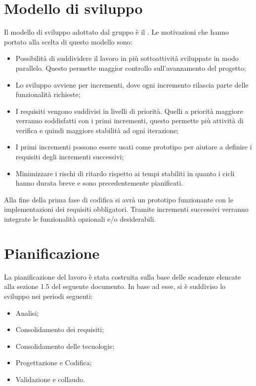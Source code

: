 \documentclass[../PianodiProgetto.tex]{subfiles}
\begin{document}
	
	\chapter{Modello di sviluppo}
	
	Il modello di sviluppo adottato dal gruppo è il . Le motivazioni che hanno portato alla scelta di questo modello sono:
	\begin{itemize}
		\item Possibilità di suddividere il lavoro in più sottoattività sviluppate in modo parallelo. Questo permette maggior controllo sull’avanzamento del progetto;
		\item Lo sviluppo avviene per incrementi, dove ogni incremento rilascia parte delle funzionalità richieste;
		\item I requisiti vengono suddivisi in livelli di priorità. Quelli a priorità maggiore verranno soddisfatti con i primi incrementi, questo permette più attività di verifica e quindi maggiore stabilità ad ogni iterazione;
		\item I primi incrementi possono essere usati come prototipo per aiutare a definire i requisiti degli incrementi successivi;
		\item Minimizzare i rischi di ritardo rispetto ai tempi stabiliti in quanto i cicli hanno durata breve e sono precedentemente pianificati.
	\end{itemize}
	Alla fine della prima fase di codifica si avrà un prototipo funzionante con le implementazioni dei requisiti obbligatori. Tramite incrementi successivi verranno integrate le funzionalità opzionali e/o desiderabili.
	
	\chapter{Pianificazione}
	
	La pianificazione del lavoro è stata costruita sulla base delle scadenze elencate alla sezione 1.5 del seguente documento. In base ad esse, si è suddiviso lo sviluppo nei periodi seguenti:
	\begin{itemize}
		\item Analisi;
		\item Consolidamento dei requisiti;
		\item Consolidamento delle tecnologie;
		\item Progettazione e Codifica;
		\item Validazione e collaudo.
	\end{itemize}
	\newpage
	
\end{document}
